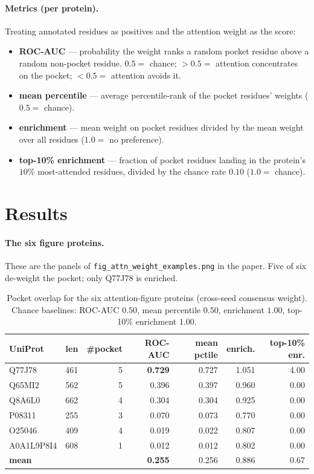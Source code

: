 \documentclass[11pt]{article}
\begin{document}
\paragraph{Metrics (per protein).} Treating annotated residues as positives
and the attention weight as the score:
\begin{itemize}\setlength\itemsep{0pt}
  \item \textbf{ROC-AUC} --- probability the weight ranks a random pocket
        residue above a random non-pocket residue. $0.5=$ chance; $>0.5=$
        attention concentrates on the pocket; $<0.5=$ attention avoids it.
  \item \textbf{mean percentile} --- average percentile-rank of the pocket
        residues' weights ($0.5=$ chance).
  \item \textbf{enrichment} --- mean weight on pocket residues divided by the
        mean weight over all residues ($1.0=$ no preference).
  \item \textbf{top-10\% enrichment} --- fraction of pocket residues landing
        in the protein's $10\%$ most-attended residues, divided by the chance
        rate $0.10$ ($1.0=$ chance).
\end{itemize}

\section{Results}

\paragraph{The six figure proteins.} These are the panels of
\texttt{fig\_attn\_weight\_examples.png} in the paper. Five of six de-weight the
pocket; only Q77J78 is enriched.

\begin{table}[h]
\centering
\small
\begin{tabular}{lrrrrrr}
\toprule
UniProt & len & \#pocket & ROC-AUC & mean pctile & enrich. & top-10\% enr. \\
\midrule
Q77J78     & 461 & 5 & \textbf{0.729} & 0.727 & 1.051 & 4.00 \\
Q65MI2     & 562 & 5 & 0.396 & 0.397 & 0.960 & 0.00 \\
Q8A6L0     & 662 & 4 & 0.304 & 0.304 & 0.925 & 0.00 \\
P08311     & 255 & 3 & 0.070 & 0.073 & 0.770 & 0.00 \\
O25046     & 409 & 4 & 0.019 & 0.022 & 0.807 & 0.00 \\
A0A1L9P8I4 & 608 & 1 & 0.012 & 0.012 & 0.802 & 0.00 \\
\midrule
\textbf{mean} & & & \textbf{0.255} & 0.256 & 0.886 & 0.67 \\
\bottomrule
\end{tabular}
\caption{Pocket overlap for the six attention-figure proteins
(cross-seed consensus weight). Chance baselines: ROC-AUC $0.50$, mean
percentile $0.50$, enrichment $1.00$, top-10\% enrichment $1.00$.}
\end{table}
\end{document}
